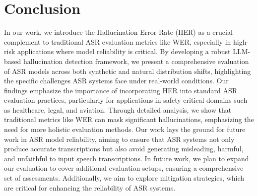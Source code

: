 \section{Conclusion}\label{sec:conclusion}

In our work, we introduce the Hallucination Error Rate (HER) as a crucial complement to traditional ASR evaluation metrics like WER, especially in high-risk applications where model reliability is critical. By developing a robust LLM-based hallucination detection framework, we present a comprehensive evaluation of ASR models across both synthetic and natural distribution shifts, highlighting the specific challenges ASR systems face under real-world conditions. Our findings emphasize the importance of incorporating HER into standard ASR evaluation practices, particularly for applications in safety-critical domains such as healthcare, legal, and aviation. Through detailed analysis, we show that traditional metrics like WER can mask significant hallucinations, emphasizing the need for more holistic evaluation methods. Our work lays the ground for future work in ASR model reliability, aiming to ensure that ASR systems not only produce accurate transcriptions but also avoid generating misleading, harmful, and unfaithful to input speech transcriptions. In future work, we plan to expand our evaluation to cover additional evaluation setups, ensuring a comprehensive set of assessments. Additionally, we aim to explore mitigation strategies, which are critical for enhancing the reliability of ASR systems.